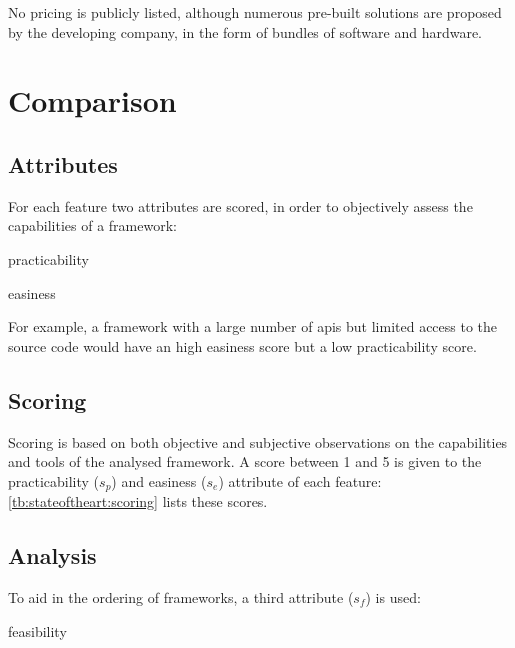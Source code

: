 No pricing is publicly listed, although numerous pre-built solutions are proposed by the developing company, in the form of bundles of software and hardware.

\section{Comparison}\label{sc:stateoftheart:comparison}

\subsection{Attributes}

For each \gls{feature} two \glspl{attribute} are scored, in order to objectively assess the capabilities of a \gls{framework}:

\begin{definition}{practicability}
\end{definition}

\begin{definition}{easiness}
\end{definition}

For example, a framework with a large number of \glspl{api} but limited access to the source code would have an high \gls{easiness} score but a low \gls{practicability} score.

\subsection{Scoring}

Scoring is based on both objective and subjective observations on the capabilities and tools of the analysed \gls{framework}. A score between \num{1} and \num{5} is given to the \gls{practicability} ($s_p$) and \gls{easiness} ($s_e$) \gls{attribute} of each \gls{feature}: \cref{tb:stateoftheart:scoring} lists these scores.



\subsection{Analysis}

To aid in the ordering of \glspl{framework}, a third \gls{attribute} ($s_f$) is used:

\begin{definition}{feasibility}
\end{definition}

